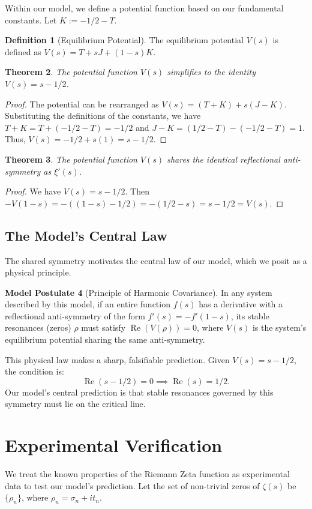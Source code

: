 \documentclass{amsart}
\theoremstyle{plain}
\newtheorem{theorem}{Theorem}
\theoremstyle{definition}
\newtheorem{definition}[theorem]{Definition}
\newtheorem{modelpostulate}[theorem]{Model Postulate}
\theoremstyle{remark}
\DeclareMathOperator{\re}{Re}
\begin{document}
Within our model, we define a potential function based on our fundamental constants. Let $K := -1/2 - T$.
\begin{definition}[Equilibrium Potential]
The equilibrium potential $V(s)$ is defined as $V(s) = T + sJ + (1-s)K$.
\end{definition}

\begin{theorem}
The potential function $V(s)$ simplifies to the identity $V(s) = s - 1/2$.
\end{theorem}
\begin{proof}
The potential can be rearranged as $V(s) = (T+K) + s(J-K)$. Substituting the definitions of the constants, we have $T+K = T + (-1/2 - T) = -1/2$ and $J-K = (1/2 - T) - (-1/2-T) = 1$. Thus, $V(s) = -1/2 + s(1) = s - 1/2$.
\end{proof}

\begin{theorem}
The potential function $V(s)$ shares the identical reflectional anti-symmetry as $\xi'(s)$.
\end{theorem}
\begin{proof}
We have $V(s) = s-1/2$. Then $-V(1-s) = -((1-s)-1/2) = -(1/2-s) = s-1/2 = V(s)$.
\end{proof}

\subsection{The Model's Central Law}
The shared symmetry motivates the central law of our model, which we posit as a physical principle.

\begin{modelpostulate}[Principle of Harmonic Covariance]
In any system described by this model, if an entire function $f(s)$ has a derivative with a reflectional anti-symmetry of the form $f'(s)=-f'(1-s)$, its stable resonances (zeros) $\rho$ must satisfy $\re(V(\rho))=0$, where $V(s)$ is the system's equilibrium potential sharing the same anti-symmetry.
\end{modelpostulate}

This physical law makes a sharp, falsifiable prediction. Given $V(s)=s-1/2$, the condition is:
\[ \re(s - 1/2) = 0 \implies \re(s) = 1/2. \]
Our model's central prediction is that stable resonances governed by this symmetry must lie on the critical line.

\section{Experimental Verification}
We treat the known properties of the Riemann Zeta function as experimental data to test our model's prediction. Let the set of non-trivial zeros of $\zeta(s)$ be $\{\rho_n\}$, where $\rho_n = \sigma_n + it_n$.
\end{document}
